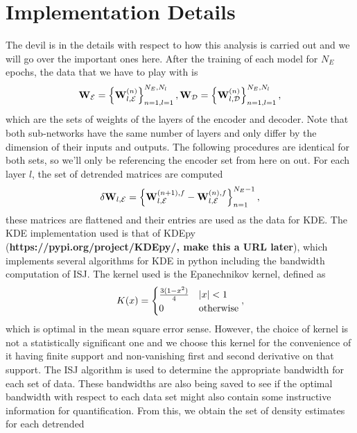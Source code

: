 \section{Implementation Details}
The devil is in the details with respect to how this analysis is carried out and we will
go over the important ones here. After the training of each model for $N_E$ epochs, the 
data that we have to play with is 
\begin{equation}
    {\bf W}_\mathcal{E} = \left\{{\bf W}_{l,\mathcal{E}}^{(n)}\right\}_{n=1, l=1}^{N_E, N_l}, 
    {\bf W}_\mathcal{D} = \left\{{\bf W}_{l,\mathcal{D}}^{(n)}\right\}_{n=1, l=1}^{N_E, N_l}, 
\end{equation}
which are the sets of weights of the layers of the encoder and decoder. Note that both sub-networks 
have the same number of layers and only differ by the dimension of their inputs and outputs.
The following procedures are identical for both sets, so we'll only be referencing the encoder set
from here on out. For each layer $l$, the set of detrended matrices are computed
\begin{equation}
    \delta{\bf W}_{l, \mathcal{E}} = \left\{{\bf W}_{l,\mathcal{E}}^{(n+1),f} - {\bf W}_{l,\mathcal{E}}^{(n),f}\right\}_{n=1}^{N_E-1},
\end{equation}
these matrices are flattened and their entries are used as the data for KDE. The KDE implementation
used is that of KDEpy ({\bf https://pypi.org/project/KDEpy/, make this a URL later}), which implements several 
algorithms for KDE in python including the bandwidth computation of ISJ. The kernel used is the Epanechnikov
kernel, defined as 
\begin{equation}
    K(x) = 
    \begin{cases}
        \frac{3(1-x^2)}{4} & \left|x\right| < 1 \\
        0 & \text{otherwise}
    \end{cases},\label{eqn:epanechnikov}
\end{equation}
which is optimal in the mean square error sense. However, the choice of kernel is not a statistically 
significant one\cite{epanechnikov} and we choose this kernel for the convenience of it having finite 
support and non-vanishing first and second derivative on that support. The ISJ algorithm is used to 
determine the appropriate bandwidth for each set of data. These bandwidths are also being saved to 
see if the optimal bandwidth with respect to each data set might also contain some instructive 
information for quantification. From this, we obtain the set of density estimates for each detrended 
